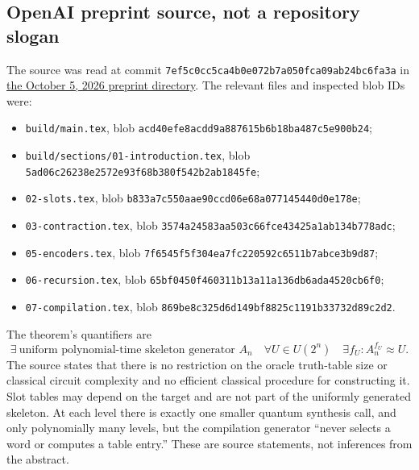 \documentclass[11pt]{article}
\begin{document}
\subsection{OpenAI preprint source, not a repository slogan}
The source was read at commit
\texttt{7ef5c0cc5ca4b0e072b7a050fca09ab24bc6fa3a} in
\href{https://github.com/openai/math/tree/7ef5c0cc5ca4b0e072b7a050fca09ab24bc6fa3a/preprints/Polynomial-Time-Unitary-Synthesis-from-a-Boolean-Oracle-October-5-2026}{the October 5, 2026 preprint directory}.
The relevant files and inspected blob IDs were:
\begin{itemize}
\item \texttt{build/main.tex}, blob
  \texttt{acd40efe8acdd9a887615b6b18ba487c5e900b24};
\item \texttt{build/sections/01-introduction.tex}, blob
  \texttt{5ad06c26238e2572e93f68b380f542b2ab1845fe};
\item \texttt{02-slots.tex}, blob
  \texttt{b833a7c550aae90ccd06e68a077145440d0e178e};
\item \texttt{03-contraction.tex}, blob
  \texttt{3574a24583aa503c66fce43425a1ab134b778adc};
\item \texttt{05-encoders.tex}, blob
  \texttt{7f6545f5f304ea7fc220592c6511b7abce3b9d87};
\item \texttt{06-recursion.tex}, blob
  \texttt{65bf0450f460311b13a11a136db6ada4520cb6f0};
\item \texttt{07-compilation.tex}, blob
  \texttt{869be8c325d6d149bf8825c1191b33732d89c2d2}.
\end{itemize}
The theorem's quantifiers are
\[
 \exists\ \text{uniform polynomial-time skeleton generator }A_n\quad
 \forall U\in U(2^n)\quad \exists f_U:
 A_n^{f_U}\approx U.
\]
The source states that there is no restriction on the oracle truth-table size
or classical circuit complexity and no efficient classical procedure for
constructing it.  Slot tables may depend on the target and are not part of the
uniformly generated skeleton.  At each level there is exactly one smaller
quantum synthesis call, and only polynomially many levels, but the compilation
generator ``never selects a word or computes a table entry.''  These are
source statements, not inferences from the abstract.
\end{document}
